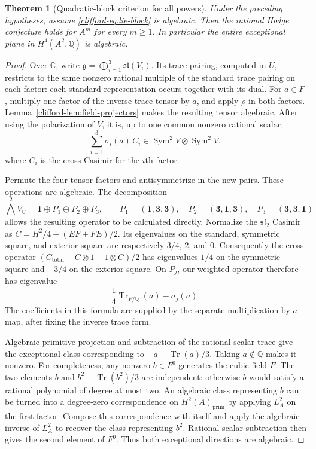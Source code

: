 \documentclass[11pt]{article}
\newtheorem{theorem}{Theorem}[section]
\theoremstyle{definition}
\theoremstyle{remark}
\begin{document}
\begin{theorem}[Quadratic-block criterion for all powers]\label{clifford-thm:quadratic-all-powers}
Under the preceding hypotheses, assume \eqref{clifford-eq:lie-block} is
algebraic.  Then the rational Hodge conjecture holds for $A^m$ for every
$m\ge1$.  In particular the entire exceptional plane in
$H^4(A^2,\mathbb Q)$ is algebraic.
\end{theorem}
\begin{proof}
Over $\mathbb C$, write $\mathfrak g=\bigoplus_{i=1}^3\mathfrak{sl}(V_i)$.
Its trace pairing, computed in $U$, restricts to the same nonzero rational
multiple of the standard trace pairing on each factor: each standard
representation occurs together with its dual.  For $a\in F$, multiply
one factor of the inverse trace tensor by $a$, and apply $\rho$ in both
factors.  Lemma~\ref{clifford-lem:field-projectors} makes the resulting tensor
algebraic.  After using the polarization of $V$, it is, up to one common
nonzero rational scalar,
\[
 \sum_{i=1}^3\sigma_i(a)\,C_i
       \in\operatorname{Sym}^2V\otimes\operatorname{Sym}^2V,
\]
where $C_i$ is the cross-Casimir for the $i$th factor.

Permute the four tensor factors and antisymmetrize in the new pairs.
These operations are algebraic.  The decomposition
\[
 \bigwedge^2V_{\mathbb C}
  =\mathbf1\oplus P_1\oplus P_2\oplus P_3,
 \qquad
 P_1=(\mathbf1,\mathbf3,\mathbf3),\quad
 P_2=(\mathbf3,\mathbf1,\mathbf3),\quad
 P_3=(\mathbf3,\mathbf3,\mathbf1)
\]
allows the resulting operator to be calculated directly.  Normalize the
$\mathfrak{sl}_2$ Casimir as
$C=H^2/4+(EF+FE)/2$.  Its eigenvalues on the standard, symmetric square,
and exterior square are respectively $3/4$, $2$, and $0$.
Consequently the cross operator
$(C_{\mathrm{total}}-C\otimes1-1\otimes C)/2$ has eigenvalues
$1/4$ on the symmetric square and $-3/4$ on the exterior square.
On $P_j$, our weighted operator therefore has eigenvalue
\begin{equation}\label{clifford-eq:weighted-eigenvalues}
 \frac14\operatorname{Tr}_{F/\mathbb Q}(a)-\sigma_j(a).
\end{equation}
The coefficients in this formula are supplied by the separate
multiplication-by-$a$ map, after fixing the inverse trace form.

Algebraic primitive projection and subtraction of the rational scalar
trace give the exceptional class corresponding to
$-a+\operatorname{Tr}(a)/3$.  Taking $a\notin\mathbb Q$ makes it nonzero.
For completeness, any nonzero $b\in F^0$ generates the cubic field $F$.
The two elements $b$ and $b^2-\operatorname{Tr}(b^2)/3$ are independent:
otherwise $b$ would satisfy a rational polynomial of degree at most two.
An algebraic class representing $b$ can be turned into a degree-zero
correspondence on $H^2(A)_{\mathrm{prim}}$ by applying $L_A^2$ on the
first factor.  Compose this correspondence with itself and apply the
algebraic inverse of $L_A^2$ to recover the class representing $b^2$.
Rational scalar subtraction then gives the second element of $F^0$.
Thus both exceptional directions are algebraic.


\end{proof}
\end{document}
